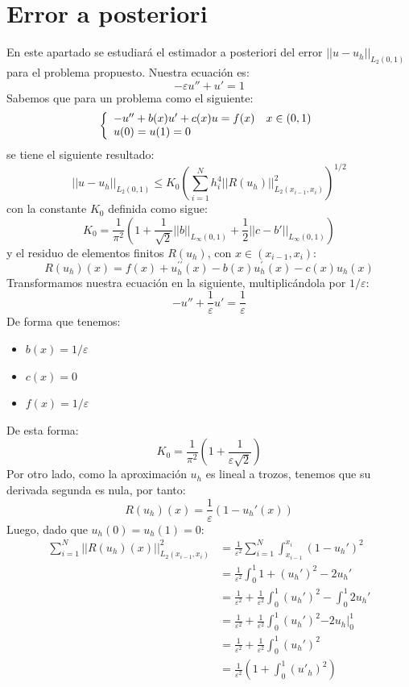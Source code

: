 \documentclass[spanish]{mathnotes}
\begin{document}
	\section{Error a posteriori}
	En este apartado se estudiará  el estimador a posteriori del error $||u-u_h||_{L_2(0,1)}$ para el problema propuesto.
	Nuestra ecuación es:
	$$-\varepsilon u'' + u' = 1$$
	Sabemos que para un problema como el siguiente:
	\begin{equation*}
	\left\{
	\begin{array}{l l}
	-u''+b(x)u'+c(x)u = f(x) & x\in(0,1)\\
	u(0) = u(1) = 0
	\end{array}
	\right.
	\end{equation*}
	se tiene el siguiente resultado:
	\begin{equation*}
		||u-u_h||_{L_2(0,1)} \le K_0\left(\sum_{i=1}^{N}h_i^4||R(u_h)||_{L_2(x_{i-1},x_i)}^2\right)^{1/2}
	\end{equation*}
	con la constante $K_0$ definida como sigue:
	$$K_0 = \frac{1}{\pi^2}\left(1+\frac{1}{\sqrt{2}}||b||_{L_\infty(0,1)}+\frac{1}{2}||c-b'||_{L_\infty(0,1)}\right)$$
	y el residuo de elementos finitos $R(u_h)$, con $x\in(x_{i-1}, x_i)$:
	$$R(u_h)(x) = f(x) + u_h^{\prime\prime}(x) -b(x)u_h^\prime(x)-c(x)u_h(x)$$
	Transformamos nuestra ecuación en la siguiente, multiplicándola por $1/\varepsilon$:
	$$-u'' + \frac{1}{\varepsilon}u' = \frac{1}{\varepsilon}$$
	De forma que tenemos:
	\begin{itemize}
		\item $b(x) = 1/\varepsilon$
		\item $c(x) = 0$
		\item $f(x) = 1/\varepsilon$
	\end{itemize}
	De esta forma:
	$$K_0 = \frac{1}{\pi^2}\left(1+\frac{1}{\varepsilon\sqrt{2}}\right)$$
	Por otro lado, como la aproximación $u_h$ es lineal a trozos, tenemos que su derivada segunda es nula, por tanto:
	$$R(u_h)(x) = \frac{1}{\varepsilon}\left(1-u_h'(x)\right)$$
	Luego, dado que $u_h(0) = u_h(1) = 0$:
	\begin{align*}
	\sum_{i=1}^N||R(u_h)(x)||_{L_2(x_{i-1},x_i)}^2 &= \frac{1}{\varepsilon^2}\sum_{i=1}^{N} \int_{x_{i-1}}^{x_i}(1-u_h')^2\\
	&=  \frac{1}{\varepsilon^2} \int_{0}^{1}1+(u_h')^2 - 2u_h'\\
	& = \frac{1}{\varepsilon^2} + \frac{1}{\varepsilon^2} \int_{0}^{1}(u_h')^2 - \int_0^1 2u_h'\\
	& = \frac{1}{\varepsilon^2} + \frac{1}{\varepsilon^2} \int_{0}^{1}(u_h')^2 \left.-2u_h\right|_0^1\\
	& = \frac{1}{\varepsilon^2} + \frac{1}{\varepsilon^2} \int_{0}^{1}(u_h')^2\\
	&= \frac{1}{\varepsilon^2}\left(1+\int_0^1 (u'_h)^2\right)
	\end{align*}
\end{document}
